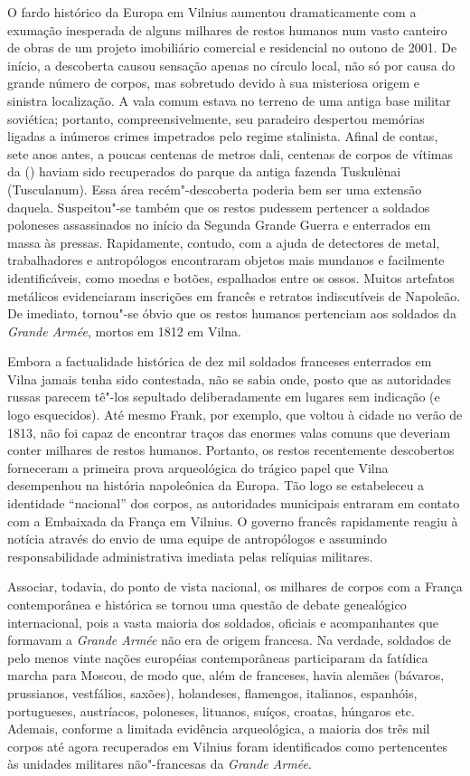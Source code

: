 O fardo histórico da Europa em Vilnius aumentou dramaticamente com a
exumação inesperada de alguns milhares de restos humanos num vasto
canteiro de obras de um projeto imobiliário comercial e residencial no
outono de 2001. De início, a descoberta causou sensação apenas no
círculo local, não só por causa do grande número de corpos, mas
sobretudo devido à sua misteriosa origem e sinistra localização. A vala
comum estava no terreno de uma antiga base militar soviética; portanto,
compreensivelmente, seu paradeiro despertou memórias ligadas a inúmeros
crimes impetrados pelo regime stalinista. Afinal de contas, sete anos
antes, a poucas centenas de metros dali, centenas de corpos de vítimas
da  () haviam sido recuperados do parque da antiga fazenda
Tuskulėnai (Tusculanum). Essa área recém"-descoberta poderia bem ser uma
extensão daquela. Suspeitou"-se também que os restos pudessem pertencer a
soldados poloneses assassinados no início da Segunda Grande Guerra e
enterrados em massa às pressas. Rapidamente, contudo, com a ajuda de
detectores de metal, trabalhadores e antropólogos encontraram objetos
mais mundanos e facilmente identificáveis, como moedas e botões,
espalhados entre os ossos. Muitos artefatos metálicos evidenciaram
inscrições em francês e retratos indiscutíveis de Napoleão. De imediato,
tornou"-se óbvio que os restos humanos pertenciam aos soldados da
\emph{Grande Armée}, mortos em 1812 em Vilna.

Embora a factualidade histórica de dez mil soldados franceses enterrados
em Vilna jamais tenha sido contestada, não se sabia onde, posto que as
autoridades russas parecem tê"-los sepultado deliberadamente em lugares
sem indicação (e logo esquecidos). Até mesmo Frank, por exemplo, que
voltou à cidade no verão de 1813, não foi capaz de encontrar traços das
enormes valas comuns que deveriam conter milhares de restos humanos.
Portanto, os restos recentemente descobertos forneceram a primeira prova
arqueológica do trágico papel que Vilna desempenhou na história
napoleônica da Europa. Tão logo se estabeleceu a identidade ``nacional''
dos corpos, as autoridades municipais entraram em contato com a
Embaixada da França em Vilnius. O governo francês rapidamente reagiu à
notícia através do envio de uma equipe de antropólogos e assumindo
responsabilidade administrativa imediata pelas relíquias militares.

Associar, todavia, do ponto de vista nacional, os milhares de corpos com
a França contemporânea e histórica se tornou uma questão de debate
genealógico internacional, pois a vasta maioria dos soldados, oficiais e
acompanhantes que formavam a \emph{Grande Armée} não era de origem
francesa. Na verdade, soldados de pelo menos vinte nações européias
contemporâneas participaram da fatídica marcha para Moscou, de modo que,
além de franceses, havia alemães (bávaros, prussianos, vestfálios,
saxões), holandeses, flamengos, italianos, espanhóis, portugueses,
austríacos, poloneses, lituanos, suíços, croatas, húngaros etc. Ademais,
conforme a limitada evidência arqueológica, a maioria dos três mil
corpos até agora recuperados em Vilnius foram identificados como
pertencentes às unidades militares não"-francesas da \emph{Grande Armée}.

